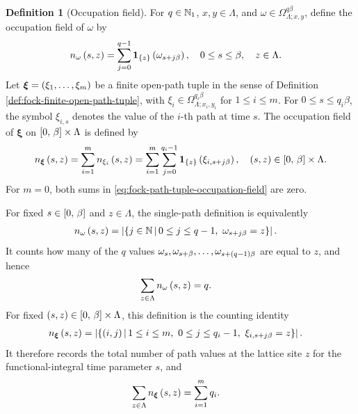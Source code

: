 \documentclass[11pt,a4paper]{article}
\theoremstyle{plain}
\theoremstyle{definition}
\newtheorem{defn}[thm]{Definition}
\theoremstyle{remark}
\begin{document}
\begin{defn}[Occupation field]\label{def:fock-path-occupation-field}
For $q\in\mathbb{N}_1$, $x,y\in\Lambda$, and
$\omega\in\Omega_{\Lambda;x,y}^{q\beta}$, define the occupation field of $\omega$ by
$$\begin{aligned}
n_{\omega} \left( s,z \right)
& =
\sum_{j = 0}^{q - 1}
\boldsymbol{1}_{\left\{ z \right\}} \left( \omega_{s + j\beta} \right),
\quad
0 \leq s \leq \beta,
\quad
z \in \Lambda.
\end{aligned}$$
Let $\boldsymbol{\xi}=\left( \xi_1,\ldots,\xi_m \right)$ be a finite open-path tuple in the sense of
Definition \ref{def:fock-finite-open-path-tuple}, with
$\xi_i\in\Omega_{\Lambda;x_i,y_i}^{q_i\beta}$ for $1\leq i\leq m$.
For $0\leq s\leq q_i\beta$, the symbol $\xi_{i,s}$ denotes the value of the $i$-th path at time $s$.
The occupation field of $\boldsymbol{\xi}$ on $\left[ 0,\,\beta \right] \times \Lambda$ is defined by
\begin{equation}
\begin{aligned}
n_{\boldsymbol{\xi}} \left( s,z \right)
=
\sum_{i = 1}^{m}n_{\xi_i} \left( s,z \right)
=
\sum_{i = 1}^{m}
\sum_{j = 0}^{q_i - 1}
\boldsymbol{1}_{\left\{ z \right\}} \left( \xi_{i,s + j\beta} \right),
\quad
\left( s,z \right)
\in
\left[ 0,\,\beta \right] \times \Lambda.
\end{aligned}
\label{eq:fock-path-tuple-occupation-field}
\end{equation}
For $m = 0$, both sums in \eqref{eq:fock-path-tuple-occupation-field} are zero.
\end{defn}

For fixed \(s\in\left[ 0,\,\beta \right]\) and \(z\in\Lambda\), the single-path definition is equivalently \[\begin{aligned}
n_{\omega} \left( s,z \right)
& =
\left| 
\left\{j\in\mathbb{N} \, \middle| \, 0\leq j\leq q-1,\ \omega_{s+j\beta}=z\right\} \right|.
\end{aligned}\] It counts how many of the \(q\) values \(\omega_s,\omega_{s+\beta},\ldots,\omega_{s+\left( q-1 \right)\beta}\) are equal to \(z\), and hence \[\begin{aligned}
\sum_{z\in\Lambda}n_{\omega} \left( s,z \right)
& =
q.
\end{aligned}\] For fixed \(\left( s,z \right)\in\left[ 0,\,\beta \right]\times\Lambda\), this definition is the counting identity \[\begin{aligned}
n_{\boldsymbol{\xi}} \left( s,z \right)
& =
\left| 
\left\{\left( i,j \right) \, \middle| \, 
1\leq i\leq m,\ 0\leq j\leq q_i-1,\ \xi_{i,s+j\beta}=z\right\} \right|.
\end{aligned}\] It therefore records the total number of path values at the lattice site \(z\) for the functional-integral time parameter \(s\), and \[\begin{aligned}
\sum_{z\in\Lambda}n_{\boldsymbol{\xi}} \left( s,z \right)
& =
\sum_{i=1}^{m}q_i.
\end{aligned}\]
\end{document}
